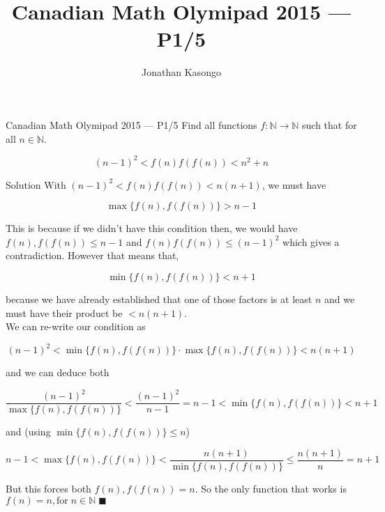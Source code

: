 \documentclass{article}
\title{Canadian Math Olymipad 2015 --- P1/5}
\author{Jonathan Kasongo}
\begin{document}
\maketitle
\begin{problem}{Canadian Math Olymipad 2015 --- P1/5}
Find all functions $f : \mathbb{N} \rightarrow \mathbb{N}$ such that for  all $n \in \mathbb{N}$.

$$
(n-1)^2 < f(n)f(f(n)) < n^2 + n
$$
\end{problem}

\begin{solution}{Solution}
With $(n-1)^2 < f(n)f(f(n)) < n(n+1)$, we must have

$$
\max \{ f(n), f(f(n)) \} > n-1
$$

This is because if we didn't have this condition then, we would
have $f(n), f(f(n)) \leq n-1$ and $f(n)f(f(n)) \leq (n-1)^2$
which gives a contradiction. However that means that,

$$
\min \{ f(n), f(f(n)) \} < n+1
$$

because we have already established that one of those factors
is at least $n$ and we must have their product be $< n(n+1)$.
\\

We can re-write our condition as

$$
(n-1)^2 < \min \{ f(n), f(f(n)) \} \cdot \max \{ f(n), f(f(n)) \} < n(n+1)
$$

and we can deduce both

$$
\frac{(n-1)^2}{\max \{ f(n), f(f(n)) \}} < \frac{(n-1)^2}{n-1} = n-1 < \min \{ f(n), f(f(n)) \} < n+1
$$

and (using $\min \{ f(n), f(f(n)) \} \leq n$)

$$
n-1 < \max \{ f(n), f(f(n)) \} < \frac{n(n+1)}{\min \{ f(n), f(f(n)) \}} \leq \frac{n(n+1)}{n} = n+1
$$

But this forces both $f(n), f(f(n)) = n$. So the only function
that works is $f(n) = n,\text{for} \; n \in \mathbb{N} \; \blacksquare$

\end{solution}
\end{document}
